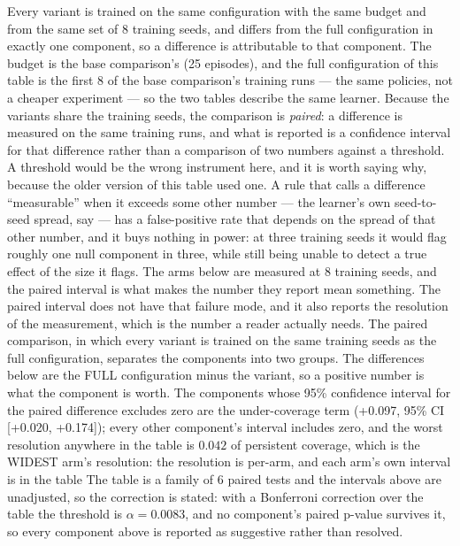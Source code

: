 \documentclass[conference]{IEEEtran}
\begin{document}
Every variant is trained on the same configuration with the same budget and
from the same set of 8 training seeds, and differs from the
full configuration in exactly one component, so a difference is
attributable to that component.  The budget is the base comparison's
(25 episodes), and the full configuration of this table is
the first 8 of the base comparison's training runs --- the same
policies, not a cheaper experiment --- so the two tables describe the same
learner.  Because the variants share the training seeds, the
comparison is \emph{paired}: a difference is measured on the same training
runs, and what is reported is a confidence interval for that difference
rather than a comparison of two numbers against a threshold.  A threshold
would be the wrong instrument here, and it is worth saying why, because
the older version of this table used one.  A rule that calls a difference
``measurable'' when it exceeds some other number --- the learner's own
seed-to-seed spread, say --- has a false-positive rate that depends on
the spread of that other number, and it buys nothing in power: at three
training seeds it would flag roughly one null component in three, while
still being unable to detect a true effect of the size it flags.  The
arms below are measured at 8 training seeds, and the paired
interval is what makes the number they report mean something.  The
paired interval does not have that failure mode, and it also reports the
resolution of the measurement, which is the number a reader actually
needs.  The paired comparison, in which every variant is trained on the same training seeds as the full configuration, separates the components into two groups.  The differences below are the FULL configuration minus the variant, so a positive number is what the component is worth.  The components whose 95\% confidence interval for the paired difference excludes zero are the under-coverage term (+0.097, 95\% CI [+0.020, +0.174]); every other component's interval includes zero, and the worst resolution anywhere in the table is $0.042$ of persistent coverage, which is the WIDEST arm's resolution: the resolution is per-arm, and each arm's own interval is in the table The table is a family of 6 paired tests and the intervals above are unadjusted, so the correction is stated: with a Bonferroni correction over the table the threshold is $\alpha = 0.0083$, and no component's paired p-value survives it, so every component above is reported as suggestive rather than resolved.
\end{document}
